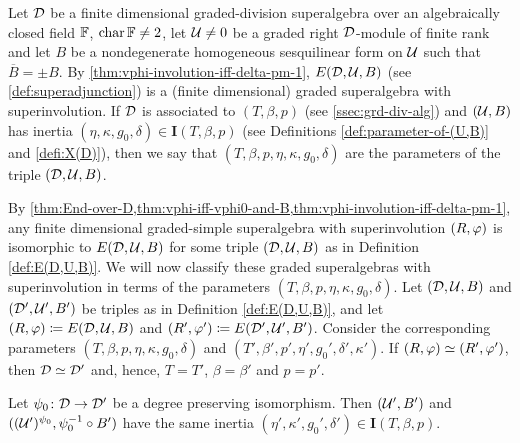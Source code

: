 \begin{defi}\label{def:E(D,U,B)}
	Let $\mathcal{D}$ be a finite dimensional graded-division superalgebra over an algebraically closed field $\mathbb{F}$, $\operatorname{char} \mathbb{F} \neq 2$, let $\mathcal U\neq 0$ be a graded right $\mathcal{D}$-module of finite rank and let $B$ be a nondegenerate homogeneous sesquilinear form on $\mathcal U$ such that $\overline{B} = \pm B$. 
	By \cref{thm:vphi-involution-iff-delta-pm-1},
	$E(\mathcal{D}, \mathcal U, B)$ (see \cref{def:superadjunction}) is a (finite dimensional) graded superalgebra with superinvolution. 
	If $\mathcal{D}$ is associated to $(T, \beta, p)$ (see \cref{ssec:grd-div-alg}) and $(\mathcal U, B)$ has inertia $(\eta, \kappa, g_0, \delta) \in \mathbf{I}(T, \beta, p)$ (see Definitions \ref{def:parameter-of-(U,B)} and \ref{defi:X(D)}), then we say that $(T, \beta, p, \eta, \kappa, g_0, \delta)$ are the parameters of the triple $(\mathcal{D}, \mathcal U, B)$.
\end{defi}

By \cref{thm:End-over-D,thm:vphi-iff-vphi0-and-B,thm:vphi-involution-iff-delta-pm-1}, any finite dimensional graded-simple superalgebra with superinvolution $(R, \varphi)$ is isomorphic to $E(\mathcal{D}, \mathcal U, B)$ for some triple $(\mathcal{D}, \mathcal U, B)$ as in Definition \ref{def:E(D,U,B)}.
We will now classify these graded superalgebras with superinvolution in terms of the parameters $(T, \beta, p, \eta, \kappa, g_0, \delta)$.
Let $(\mathcal{D}, \mathcal U, B)$ and $(\mathcal{D}', \mathcal U', B')$ be triples as in Definition \ref{def:E(D,U,B)}, and let $(R, \varphi) \coloneqq E(\mathcal{D}, \mathcal U, B)$ and $(R', \varphi') \coloneqq E(\mathcal{D}', \mathcal U', B')$.
Consider the corresponding parameters $(T, \beta, p, \eta, \kappa, g_0, \delta)$ and $(T', \beta', p', \eta', g_0', \delta', \kappa')$.
If $(R, \varphi) \simeq (R', \varphi')$, then $\mathcal{D} \simeq \mathcal{D}'$ and, hence, $T = T'$, $\beta = \beta'$ and $p = p'$.

\begin{lemma}\label{lemma:twist-same-inertia}
	Let $\psi_0\colon \mathcal{D} \to \mathcal{D}'$ be a degree preserving isomorphism.
	Then $(\mathcal U',B')$ and $((\mathcal U')^{\psi_0}, \psi_0^{-1} \circ B')$ have the same inertia $(\eta', \kappa', g_0', \delta') \in \mathbf{I}(T, \beta, p)$.
\end{lemma}

